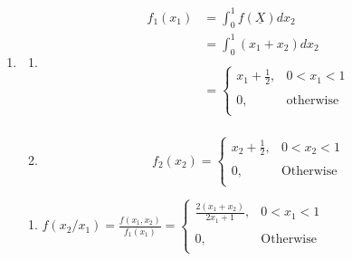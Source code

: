 \documentclass[11pt,a4paper]{article}
\theoremstyle{definition}
\begin{document}
\begin{enumerate}
\begin{align*}
\text{Hence}\quad  var(\underline{X}) & = E(\underline{X}-\underline{\mu})(\underline{X}-\underline{\mu})'= E[G(\underline{X})]\\\\
& = \begin{pmatrix}
var(x_1) & Cov(x_1,x_2)\\
Cov(x_1,x_2) & var(x_2)\\
\end{pmatrix}\\\\
& = \begin{pmatrix}
\frac{11}{144} & -\frac{1}{144}\\\\
-\frac{1}{144} & \frac{11}{144}\\
\end{pmatrix}\\
\end{align*}



\item 
\begin{enumerate}

\item
\begin{align*}
f_1(x_1) & = \int^1_0f(\underline{X})dx_2\\
         & = \int^1_0 (x_1+x_2) dx_2\\\\
         & = 
\begin{cases}
x_1 + \frac{1}{2} , & 0<x_1<1\\\\
0, & \text{otherwise}\\
\end{cases}\\
\end{align*}

\item
$$f_2(x_2)=
\begin{cases}
x_2 + \frac{1}{2}, & 0< x_2 < 1\\\\
0, & \text{Otherwise}\\
\end{cases}
$$
\end{enumerate}


\begin{enumerate}
\item $\displaystyle{f(x_2/x_1) = \frac{f(x_1,x_2)}{f_1(x_1)}=
\begin{cases}
\frac{2(x_1+x_2)}{2x_1+1}, & 0<x_1<1\\\\
0, & \text{Otherwise}\\
\end{cases}
}$\\



\end{enumerate}
\end{enumerate}
\end{document}
